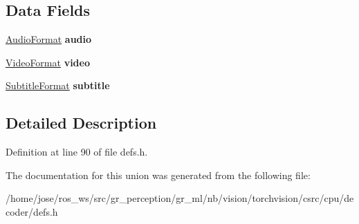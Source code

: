 \subsection*{Data Fields}
\begin{DoxyCompactItemize}
\item 
\mbox{\label{unionffmpeg_1_1FormatUnion_af4f9a165dc5f7d65bdcc7c2682cd0b6e}} 
\hyperlink{structffmpeg_1_1AudioFormat}{Audio\+Format} {\bfseries audio}
\item 
\mbox{\label{unionffmpeg_1_1FormatUnion_aa6d0d4286834d415c4eaad0d3acb617b}} 
\hyperlink{structffmpeg_1_1VideoFormat}{Video\+Format} {\bfseries video}
\item 
\mbox{\label{unionffmpeg_1_1FormatUnion_af9bdc3095227fe7ef1dc685a210cad0d}} 
\hyperlink{structffmpeg_1_1SubtitleFormat}{Subtitle\+Format} {\bfseries subtitle}
\end{DoxyCompactItemize}


\subsection{Detailed Description}


Definition at line 90 of file defs.\+h.



The documentation for this union was generated from the following file\+:\begin{DoxyCompactItemize}
\item 
/home/jose/ros\+\_\+ws/src/gr\+\_\+perception/gr\+\_\+ml/nb/vision/torchvision/csrc/cpu/decoder/defs.\+h\end{DoxyCompactItemize}
